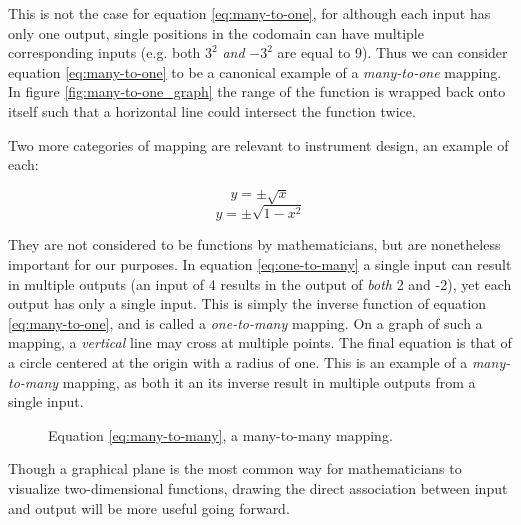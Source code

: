 	This is not the case for equation \ref{eq:many-to-one}, for although each input has only one output, single positions in the codomain can have multiple corresponding inputs (e.g. both $3^2$ \emph{and} $-3^2$ are equal to 9). Thus we can consider equation \ref{eq:many-to-one} to be a canonical example of a \emph{many-to-one} mapping. In figure \ref{fig:many-to-one_graph} the range of the function is wrapped back onto itself such that a horizontal line could intersect the function twice.

	Two more categories of mapping are relevant to instrument design, an example of each:  

	\begin{equation} y = \pm\sqrt{x} \label{eq:one-to-many} \end{equation} 
	\begin{equation} y = \pm\sqrt{1 - x^2} \label{eq:many-to-many} \end{equation} 

	They are not considered to be functions by mathematicians, but are nonetheless important for our purposes. In equation \ref{eq:one-to-many} a single input can result in multiple outputs (an input of 4 results in the output of \emph{both} 2 and -2), yet each output has only a single input. This is simply the inverse function of equation \ref{eq:many-to-one}, and is called a \emph{one-to-many} mapping. On a graph of such a mapping, a \emph{vertical} line may cross at multiple points. The final equation is that of a circle centered at the origin with a radius of one. This is an example of a \emph{many-to-many} mapping, as both it an its inverse result in multiple outputs from a single input.

	\begin{figure}[h]
		\centering
	\caption{Equation \ref{eq:many-to-many}, a many-to-many mapping.}
	\end{figure}

	Though a graphical plane is the most common way for mathematicians to visualize two-dimensional functions, drawing the direct association between input and output will be more useful going forward.

